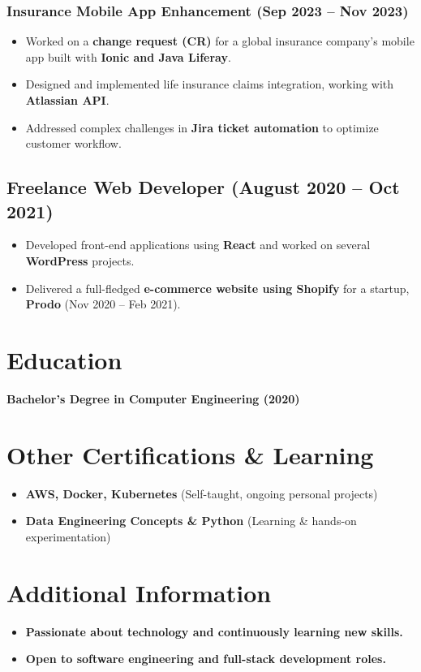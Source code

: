 \documentclass[a4paper,11pt]{article}
\begin{document}
\subsubsection*{Insurance Mobile App Enhancement (Sep 2023 – Nov 2023)}
\begin{itemize}
    \item Worked on a \textbf{change request (CR)} for a global insurance company's mobile app built with \textbf{Ionic and Java Liferay}.
    \item Designed and implemented life insurance claims integration, working with \textbf{Atlassian API}.
    \item Addressed complex challenges in \textbf{Jira ticket automation} to optimize customer workflow.
\end{itemize}

\subsection*{Freelance Web Developer (August 2020 – Oct 2021)}
\begin{itemize}
    \item Developed front-end applications using \textbf{React} and worked on several \textbf{WordPress} projects.
    \item Delivered a full-fledged \textbf{e-commerce website using Shopify} for a startup, \textbf{Prodo} (Nov 2020 – Feb 2021).
\end{itemize}

\section*{Education}
\textbf{Bachelor's Degree in Computer Engineering (2020)}

\section*{Other Certifications \& Learning}
\begin{itemize}
    \item \textbf{AWS, Docker, Kubernetes} (Self-taught, ongoing personal projects)
    \item \textbf{Data Engineering Concepts \& Python} (Learning \& hands-on experimentation)
\end{itemize}

\section*{Additional Information}
\begin{itemize}
    \item \textbf{Passionate about technology and continuously learning new skills.}
    \item \textbf{Open to software engineering and full-stack development roles.}
\end{itemize}
\end{document}
